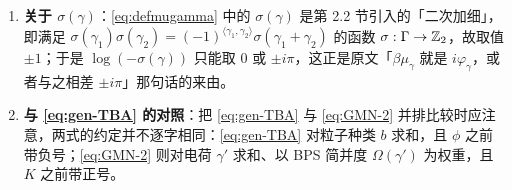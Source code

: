 \begin{yizhu}
\begin{enumerate}[leftmargin=2em,itemsep=2pt,topsep=2pt]
\item \textbf{关于 $\sigma(\gamma)$}：\eqref{eq:defmugamma} 中的 $\sigma(\gamma)$ 是第 2.2 节引入的「二次加细」，即满足 $\sigma(\gamma_1)\sigma(\gamma_2) = (-1)^{\langle \gamma_1, \gamma_2\rangle} \sigma(\gamma_1+\gamma_2)$ 的函数 $\sigma:\Gamma\to\mathbb{Z}_2$，故取值 $\pm1$；于是 $\log(-\sigma(\gamma))$ 只能取 $0$ 或 $\pm i\pi$，这正是原文「$\beta\mu_\gamma$ 就是 $i\varphi_\gamma$，或者与之相差 $\pm i\pi$」那句话的来由。%
\item \textbf{与 \eqref{eq:gen-TBA} 的对照}：把 \eqref{eq:gen-TBA} 与 \eqref{eq:GMN-2} 并排比较时应注意，两式的约定并不逐字相同：\eqref{eq:gen-TBA} 对粒子种类 $b$ 求和，且 $\phi$ 之前带负号；\eqref{eq:GMN-2} 则对电荷 $\gamma'$ 求和、以 BPS 简并度 $\Omega(\gamma')$ 为权重，且 $K$ 之前带正号。
\end{enumerate}
\end{yizhu}
